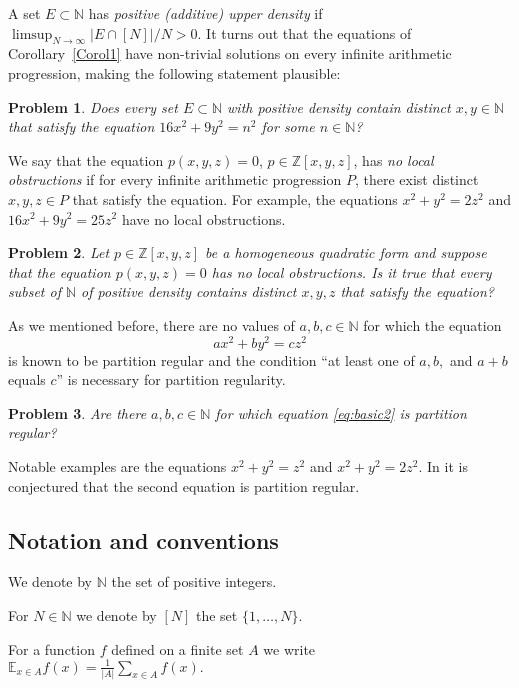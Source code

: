 \documentclass[11pt]{amsart}
\newtheorem{problem}{Problem}
\theoremstyle{definition}
\begin{document}
 A set $E\subset{{\mathbb N}}$ has \emph{positive
\emph{(additive)} upper density} if $\limsup_{N\to\infty}|E\cap [N]|/N>0$.
It turns out that the equations of Corollary~\ref{Corol1}
 have non-trivial solutions on
every
 infinite arithmetic progression, making the following statement  plausible:
\begin{problem}
Does every set $E\subset {{\mathbb N}}$ with positive density contain distinct
$x,y\in {{\mathbb N}}$ that satisfy  the equation $16x^2+9y^2=n^2$ for some $n\in{{\mathbb N}}$?
\end{problem}
We say that the equation $p(x,y,z)=0$, $p\in {{\mathbb Z}}[x,y,z]$,  has
\emph{no local obstructions} if for every infinite arithmetic progression $P$, there exist distinct $x,y,z\in P$ that satisfy the equation. For example, the equations $x^2+y^2=2z^2$ and $16x^2+9y^2=25z^2$
 have no local obstructions.
\begin{problem}
Let $p\in {{\mathbb Z}}[x,y,z]$ be
 a homogeneous quadratic form and suppose that the equation $p(x,y,z)=0$ has no local obstructions. Is it true that
every subset  of ${{\mathbb N}}$ of positive  density contains distinct $x,y,z$ that satisfy the equation?
\end{problem}
As we mentioned before,  there are no values of $a,b,c\in {{\mathbb N}}$  for
which  the equation
\begin{equation}\label{eq:basic2}
ax^2+by^2=cz^2
\end{equation}
is known to be partition regular and  the condition ``at least one of $a,b,$ and  $a+b$
 equals  $c$'' is necessary for partition regularity.
\begin{problem}
Are there  $a,b,c\in {{\mathbb N}}$ for which  equation \eqref{eq:basic2} is
partition regular? 
\end{problem}
Notable examples are the equations $x^2+y^2=z^2$ and $x^2+y^2=2z^2$.
In \cite{GR12} it is conjectured that the second equation is
partition regular.

\subsection{Notation and conventions}
  We denote by ${{\mathbb N}}$ the set of positive integers.

 \smallskip

\noindent For $N\in {{\mathbb N}}$ we denote by $[N]$ the set $\{1,\ldots,
N\}$.

\smallskip

\noindent For a function $f$  defined on a finite set $A$ we write $
{{\mathbb E}}_{x\in A}f(x)=\frac 1{|A|}\sum_{x\in A}f(x). $
\end{document}
